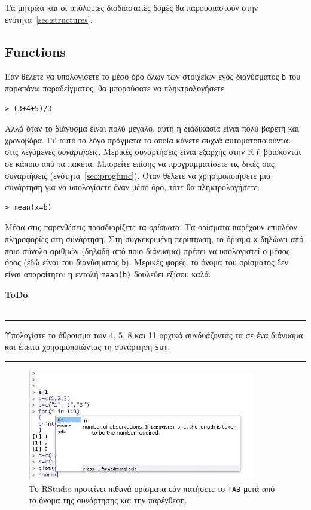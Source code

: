 \documentclass[a4paper,11pt,twocolumn,tablecaptionabove]{scrartcl}
\newenvironment{ToDo} {%
  \begin{flushright}
    \hfill
    \begin{minipage}{0.95\columnwidth}         %
    \textsf{\textbf{ToDo}} \\
      \vspace{-0.85cm}\\
      {\color{Gray}\rule[-0.1cm]{\columnwidth}{1.5pt}}} { %
      {\color{Gray} \rule[0.3cm]{\columnwidth}{1.5pt}}
    \end{minipage}
    \vspace{1em}
  \end{flushright}
  }
\begin{document}
Τα μητρώα και οι υπόλοιπες δισδιάστατες δομές θα παρουσιαστούν στην ενότητα~\ref{sec:structures}.

\subsection{Functions}

Εάν θέλετε να υπολογίσετε το μέσο όρο όλων των στοιχείων ενός διανύσματος \texttt{b} του παραπάνω παραδείγματος,
θα μπορούσατε να πληκτρολογήσετε 
\begin{Verbatim}[frame=single,gobble=0]
> (3+4+5)/3
\end{Verbatim}
Αλλά όταν το διάνυσμα είναι πολύ μεγάλο, αυτή η διαδικασία είναι πολύ βαρετή και χρονοβόρα. Γι' αυτό το λόγο
πράγματα τα οποία κάνετε συχνά αυτοματοποιούνται στις λεγόμενες \emph{συναρτήσεις}. Μερικές συναρτήσεις είναι 
εξαρχής στην R ή βρίσκονται σε κάποιο από τα πακέτα. Μπορείτε επίσης να προγραμματίσετε τις δικές σας 
συναρτήσεις (ενότητα~\ref{sec:progfunc}). Όταν θέλετε να χρησιμοποιήσετε μια συνάρτηση για να υπολογίσετε έναν
μέσο όρο, τότε θα πληκτρολογήσετε:
\begin{Verbatim}[frame=single,gobble=0]
> mean(x=b)
\end{Verbatim}

Μέσα στις παρενθέσεις προσδιορίζετε τα \emph{ορίσματα}. Τα ορίσματα παρέχουν επιπλέον πληροφορίες στη 
συνάρτηση. Στη συγκεκριμένη περίπτωση, το όρισμα \texttt{x} δηλώνει από ποιο σύνολο αριθμών (δηλαδή από ποιο
διάνυσμα) πρέπει να υπολογιστεί ο μέσος όρος (εδώ είναι του διανύσματος \texttt{b}). Μερικές φορές, το όνομα
του ορίσματος δεν είναι απαραίτητο: η εντολή \texttt{mean(b)} δουλεύει εξίσου καλά.

\begin{ToDo}
Υπολογίστε το άθροισμα των 4, 5, 8 και 11 αρχικά συνδυάζοντάς τα σε ένα διάνυσμα και έπειτα χρησιμοποιώντας
τη συνάρτηση \texttt{sum}.\\
\end{ToDo}

\begin{figure}[htb]
  \centering
  \includegraphics[width=10cm, clip=true, trim=0cm 0cm 0cm 1cm]{img/tab_RStudio.jpg}
  \caption{Το RStudio προτείνει πιθανά ορίσματα εάν πατήσετε το \texttt{TAB} μετά από το όνομα της συνάρτησης
  και την παρένθεση.}
  \label{fig:tab_RStudio}
\end{figure}
\end{document}
